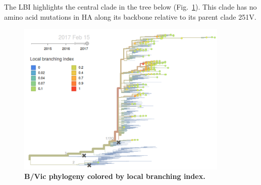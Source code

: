 \documentclass[11pt,oneside,letterpaper]{article}
\begin{document}
\pagebreak

The LBI highlights the central clade in the tree below (Fig.\ \ref{Yam_lbi}). This clade has no amino acid mutations in HA along its backbone relative to its parent clade 251V.

\begin{figure}[H]
	\centering
	\includegraphics[width=0.9\textwidth]{../figures/feb-2017/yam_lbi.png}
	\caption{\textbf{B/Vic phylogeny colored by local branching index.}
	}
	\label{Yam_lbi}
\end{figure}

\clearpage
\pagebreak



\end{document}
